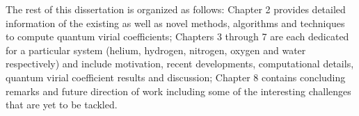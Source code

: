         The rest of this dissertation is organized as follows: Chapter 2 provides detailed information of the existing as well as novel methods, algorithms and techniques to compute quantum virial coefficients; Chapters 3 through 7 are each dedicated for a particular system (helium, hydrogen, nitrogen, oxygen and water respectively) and include motivation, recent developments, computational details, quantum virial coefficient results and discussion; Chapter 8 contains concluding remarks and future direction of work including some of the interesting challenges that are yet to be tackled.
